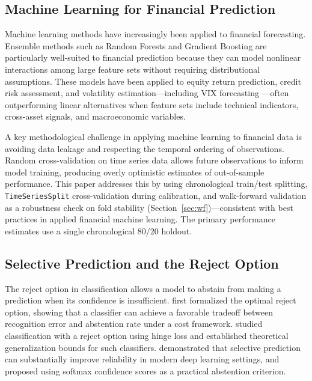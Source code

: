 \documentclass[12pt]{article}
\begin{document}
\subsection{Machine Learning for Financial Prediction}

Machine learning methods have increasingly been applied to financial forecasting. Ensemble methods such as Random Forests \citep{breiman2001} and Gradient Boosting are particularly well-suited to financial prediction because they can model nonlinear interactions among large feature sets without requiring distributional assumptions. These models have been applied to equity return prediction, credit risk assessment, and volatility estimation---including VIX forecasting \citep{fernandes2014}---often outperforming linear alternatives when feature sets include technical indicators, cross-asset signals, and macroeconomic variables.

A key methodological challenge in applying machine learning to financial data is avoiding data leakage and respecting the temporal ordering of observations. Random cross-validation on time series data allows future observations to inform model training, producing overly optimistic estimates of out-of-sample performance. This paper addresses this by using chronological train/test splitting, \texttt{TimeSeriesSplit} cross-validation during calibration, and walk-forward validation as a robustness check on fold stability (Section~\ref{sec:wf})---consistent with best practices in applied financial machine learning. The primary performance estimates use a single chronological 80/20 holdout.

\subsection{Selective Prediction and the Reject Option}

The reject option in classification allows a model to abstain from making a prediction when its confidence is insufficient. \citet{chow1970} first formalized the optimal reject option, showing that a classifier can achieve a favorable tradeoff between recognition error and abstention rate under a cost framework. \citet{bartlett2008} studied classification with a reject option using hinge loss and established theoretical generalization bounds for such classifiers. \citet{geifman2017} demonstrated that selective prediction can substantially improve reliability in modern deep learning settings, and proposed using softmax confidence scores as a practical abstention criterion.
\end{document}
